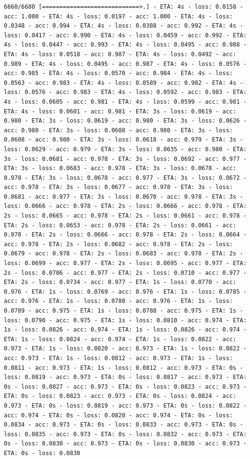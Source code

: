 \documentclass[11pt]{article}
\begin{document}
\begin{Verbatim}[commandchars=\\\{\}]
6660/6680 [============================>.] - ETA: 4s - loss: 0.0158 - acc: 1.000 - ETA: 4s - loss: 0.0197 - acc: 1.000 - ETA: 4s - loss: 0.0348 - acc: 0.994 - ETA: 4s - loss: 0.0388 - acc: 0.992 - ETA: 4s - loss: 0.0417 - acc: 0.990 - ETA: 4s - loss: 0.0459 - acc: 0.992 - ETA: 4s - loss: 0.0447 - acc: 0.993 - ETA: 4s - loss: 0.0495 - acc: 0.988 - ETA: 4s - loss: 0.0518 - acc: 0.987 - ETA: 4s - loss: 0.0492 - acc: 0.989 - ETA: 4s - loss: 0.0495 - acc: 0.987 - ETA: 4s - loss: 0.0576 - acc: 0.985 - ETA: 4s - loss: 0.0570 - acc: 0.984 - ETA: 4s - loss: 0.0563 - acc: 0.983 - ETA: 4s - loss: 0.0589 - acc: 0.982 - ETA: 4s - loss: 0.0576 - acc: 0.983 - ETA: 4s - loss: 0.0592 - acc: 0.983 - ETA: 4s - loss: 0.0605 - acc: 0.981 - ETA: 4s - loss: 0.0599 - acc: 0.981 - ETA: 4s - loss: 0.0601 - acc: 0.981 - ETA: 3s - loss: 0.0619 - acc: 0.980 - ETA: 3s - loss: 0.0619 - acc: 0.980 - ETA: 3s - loss: 0.0626 - acc: 0.980 - ETA: 3s - loss: 0.0608 - acc: 0.980 - ETA: 3s - loss: 0.0608 - acc: 0.980 - ETA: 3s - loss: 0.0618 - acc: 0.979 - ETA: 3s - loss: 0.0629 - acc: 0.979 - ETA: 3s - loss: 0.0635 - acc: 0.980 - ETA: 3s - loss: 0.0681 - acc: 0.978 - ETA: 3s - loss: 0.0692 - acc: 0.977 - ETA: 3s - loss: 0.0683 - acc: 0.978 - ETA: 3s - loss: 0.0678 - acc: 0.978 - ETA: 3s - loss: 0.0678 - acc: 0.977 - ETA: 3s - loss: 0.0672 - acc: 0.978 - ETA: 3s - loss: 0.0677 - acc: 0.978 - ETA: 3s - loss: 0.0681 - acc: 0.977 - ETA: 3s - loss: 0.0670 - acc: 0.978 - ETA: 3s - loss: 0.0666 - acc: 0.978 - ETA: 2s - loss: 0.0666 - acc: 0.978 - ETA: 2s - loss: 0.0665 - acc: 0.978 - ETA: 2s - loss: 0.0661 - acc: 0.978 - ETA: 2s - loss: 0.0653 - acc: 0.978 - ETA: 2s - loss: 0.0661 - acc: 0.978 - ETA: 2s - loss: 0.0666 - acc: 0.978 - ETA: 2s - loss: 0.0664 - acc: 0.978 - ETA: 2s - loss: 0.0682 - acc: 0.978 - ETA: 2s - loss: 0.0679 - acc: 0.978 - ETA: 2s - loss: 0.0683 - acc: 0.978 - ETA: 2s - loss: 0.0699 - acc: 0.977 - ETA: 2s - loss: 0.0695 - acc: 0.977 - ETA: 2s - loss: 0.0706 - acc: 0.977 - ETA: 2s - loss: 0.0710 - acc: 0.977 - ETA: 2s - loss: 0.0734 - acc: 0.977 - ETA: 1s - loss: 0.0770 - acc: 0.976 - ETA: 1s - loss: 0.0769 - acc: 0.976 - ETA: 1s - loss: 0.0785 - acc: 0.976 - ETA: 1s - loss: 0.0780 - acc: 0.976 - ETA: 1s - loss: 0.0789 - acc: 0.975 - ETA: 1s - loss: 0.0788 - acc: 0.975 - ETA: 1s - loss: 0.0790 - acc: 0.975 - ETA: 1s - loss: 0.0810 - acc: 0.974 - ETA: 1s - loss: 0.0826 - acc: 0.974 - ETA: 1s - loss: 0.0826 - acc: 0.974 - ETA: 1s - loss: 0.0824 - acc: 0.974 - ETA: 1s - loss: 0.0822 - acc: 0.973 - ETA: 1s - loss: 0.0820 - acc: 0.973 - ETA: 1s - loss: 0.0822 - acc: 0.973 - ETA: 1s - loss: 0.0812 - acc: 0.973 - ETA: 1s - loss: 0.0811 - acc: 0.973 - ETA: 1s - loss: 0.0812 - acc: 0.973 - ETA: 0s - loss: 0.0819 - acc: 0.973 - ETA: 0s - loss: 0.0817 - acc: 0.973 - ETA: 0s - loss: 0.0827 - acc: 0.973 - ETA: 0s - loss: 0.0823 - acc: 0.973 - ETA: 0s - loss: 0.0823 - acc: 0.973 - ETA: 0s - loss: 0.0824 - acc: 0.973 - ETA: 0s - loss: 0.0819 - acc: 0.973 - ETA: 0s - loss: 0.0822 - acc: 0.974 - ETA: 0s - loss: 0.0820 - acc: 0.974 - ETA: 0s - loss: 0.0834 - acc: 0.973 - ETA: 0s - loss: 0.0833 - acc: 0.973 - ETA: 0s - loss: 0.0835 - acc: 0.973 - ETA: 0s - loss: 0.0832 - acc: 0.973 - ETA: 0s - loss: 0.0830 - acc: 0.973 - ETA: 0s - loss: 0.0830 - acc: 0.973 - ETA: 0s - loss: 0.0830 
\end{Verbatim}
\end{document}

